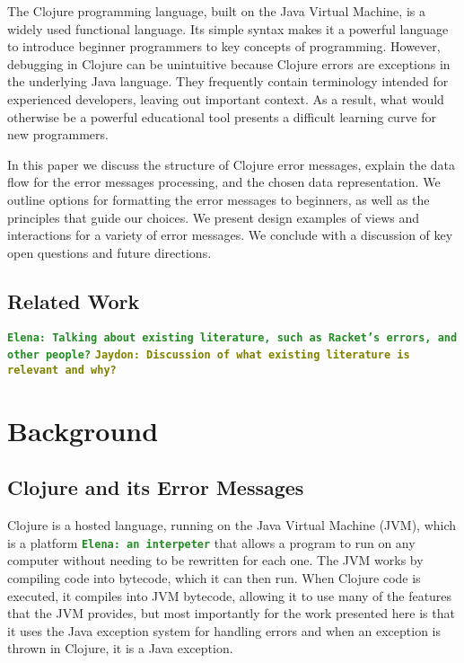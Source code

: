 \documentclass[12pt]{article}
\newcommand{\comment}[1]{{\bf \tt  {#1}}}
\newcommand{\emcomment}[1]{\textcolor{ForestGreen}{\comment{Elena: {#1}}}}
\newcommand{\tkcomment}[1]{\textcolor{Teal}{\comment{Tristan: {#1}}}}
\newcommand{\jscomment}[1]{\textcolor{olive}{\comment{Jaydon: {#1}}}}
\begin{document}
The Clojure programming language, built on the Java Virtual Machine, is a widely used functional language. 
Its simple syntax makes it a powerful language to introduce beginner programmers to key concepts of programming.
However, debugging in Clojure can be unintuitive because Clojure errors are exceptions in the underlying Java language. 
They frequently contain terminology intended for experienced developers, leaving out important context. 
As a result, what would otherwise be a powerful educational tool presents a difficult learning curve for new programmers.

In this paper we discuss the structure of Clojure error messages, 
explain the data flow for the error messages processing, 
and the chosen data representation. 
We outline options for formatting the error messages to beginners, as well as the principles that guide our choices. 
We present design examples of views and interactions for a variety of error messages. 
We conclude with a discussion of key open questions and future directions. 

\cite{Hickey:2008}

\subsection{Related Work}\label{subsec:related}

\cite{cosmetic}

\emcomment{Talking about existing literature, such as Racket's errors, and other people?}
\jscomment{Discussion of what existing literature is relevant and why?}

\section{Background}\label{sec:background}

\subsection{Clojure and its Error Messages}\label{subsec:clojure-errs}
	Clojure is a hosted language, running on the Java Virtual Machine (JVM), which is a platform \emcomment{an interpeter} that allows a program to run on any computer without needing to be rewritten for each one. 
	The JVM works by compiling code into bytecode, which it can then run. When Clojure code is executed, it compiles into JVM bytecode, allowing it to use many of the features that the JVM provides, 
	but most importantly for the work presented here is that it uses the Java exception system for handling errors and when an exception is thrown in Clojure, it is a Java exception.
    
\end{document}
